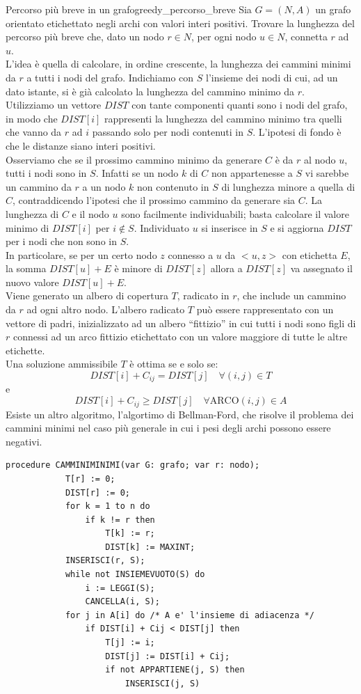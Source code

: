 \documentclass[12pt]{report}
\newcommand{\nmu}{}
\begin{document}
 \begin{example}{\nmu Percorso più breve in un grafo}{greedy_percorso_breve}
 	Sia $G=(N, A)$ un grafo orientato etichettato negli archi con valori interi positivi. Trovare la lunghezza del percorso più breve che, dato un nodo $r\in N$, per ogni nodo $u \in N$, connetta $r$ ad $u$. \\
 	L'idea è quella di calcolare, in ordine crescente, la lunghezza dei cammini minimi da $r$ a tutti i nodi del grafo. Indichiamo con $S$ l'insieme dei nodi di cui, ad un dato istante, si è già calcolato la lunghezza del cammino minimo da $r$. \\
 	Utilizziamo un vettore $DIST$ con tante componenti quanti sono i nodi del grafo, in modo che $DIST[i]$ rappresenti la lunghezza del cammino minimo tra quelli che vanno da $r$ ad $i$ passando solo per nodi contenuti in $S$. L'ipotesi di fondo è che le distanze siano interi positivi. \\
 	Osserviamo che se il prossimo cammino minimo da generare $C$ è da $r$ al nodo $u$, tutti i nodi sono in $S$. Infatti se un nodo $k$ di $C$ non appartenesse a $S$ vi sarebbe un cammino da $r$ a un nodo $k$ non contenuto in $S$ di lunghezza minore a quella di $C$, contraddicendo l'ipotesi che il prossimo cammino da generare sia $C$. La lunghezza di $C$ e il nodo $u$ sono facilmente individuabili; basta calcolare il valore minimo di $DIST[i]$ per $i \notin S$. Individuato $u$ si inserisce in $S$ e si aggiorna $DIST$ per i nodi che non sono in $S$. \\
 	In particolare, se per un certo nodo $z$ connesso a $u$ da $<u, z>$ con etichetta $E$, la somma $DIST[u] + E$ è minore di $DIST[z]$ allora a $DIST[z]$ va assegnato il nuovo valore $DIST[u] + E$. \\
 	Viene generato un albero di copertura $T$, radicato in $r$, che include un cammino da $r$ ad ogni altro nodo. L'albero radicato $T$ può essere rappresentato con un vettore di padri, inizializzato ad un albero ``fittizio'' in cui tutti i nodi sono figli di $r$ connessi ad un arco fittizio etichettato con un valore maggiore di tutte le altre etichette. \\
 	Una soluzione ammissibile $T$ è ottima se e solo se:
 	\[
 	DIST[i] + C_{ij} = DIST[j] \quad \forall (i, j) \in T
 	\]
 	e
 	\[
 	DIST[i]  +C_{ij} \geq DIST[j] \quad \forall \text{ARCO}(i, j) \in A
 	\]
 	Esiste un altro algoritmo, l'algortimo di Bellman-Ford, che risolve il problema dei cammini minimi nel caso più generale in cui i pesi degli archi possono essere negativi.
 	\begin{lstlisting}[style=pascalstyle]
 		procedure CAMMINIMINIMI(var G: grafo; var r: nodo);
 			T[r] := 0;
 			DIST[r] := 0;
 			for k = 1 to n do
 				if k != r then
 					T[k] := r;
 					DIST[k] := MAXINT;
 			INSERISCI(r, S);
 			while not INSIEMEVUOTO(S) do
 				i := LEGGI(S);
 				CANCELLA(i, S);
 			for j in A[i] do /* A e' l'insieme di adiacenza */
 				if DIST[i] + Cij < DIST[j] then
 					T[j] := i;
 					DIST[j] := DIST[i] + Cij;
 					if not APPARTIENE(j, S) then
						INSERISCI(j, S)\end{lstlisting}
  \end{example}
\end{document}
